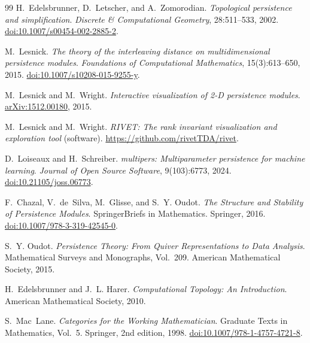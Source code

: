 \documentclass{article}
\newcommand{\<}{\langle}
\renewcommand{\>}{\rangle}
\theoremstyle{definition}
\theoremstyle{remark}
\begin{document}
\begin{thebibliography}{99}
		H.~Edelsbrunner, D.~Letscher, and A.~Zomorodian.
		\newblock \emph{Topological persistence and simplification}.
		\newblock \emph{Discrete \& Computational Geometry}, 28:511--533, 2002.
		\newblock \href{https://doi.org/10.1007/s00454-002-2885-2}{doi:10.1007/s00454-002-2885-2}.
		
		M.~Lesnick.
		\newblock \emph{The theory of the interleaving distance on multidimensional
			persistence modules}.
		\newblock \emph{Foundations of Computational Mathematics}, 15(3):613--650, 2015.
		\newblock \href{https://doi.org/10.1007/s10208-015-9255-y}{doi:10.1007/s10208-015-9255-y}.
		
		M.~Lesnick and M.~Wright.
		\newblock \emph{Interactive visualization of 2-D persistence modules}.
		\newblock \href{https://arxiv.org/abs/1512.00180}{arXiv:1512.00180}, 2015.
		
		M.~Lesnick and M.~Wright.
		\newblock \emph{RIVET: The rank invariant visualization and exploration tool}
		(software).
		\newblock \url{https://github.com/rivetTDA/rivet}.
		
		D.~Loiseaux and H.~Schreiber.
		\newblock \emph{multipers: Multiparameter persistence for machine learning}.
		\newblock \emph{Journal of Open Source Software}, 9(103):6773, 2024.
		\newblock \href{https://doi.org/10.21105/joss.06773}{doi:10.21105/joss.06773}.
		
		F.~Chazal, V.~de~Silva, M.~Glisse, and S.~Y. Oudot.
		\newblock \emph{The Structure and Stability of Persistence Modules}.
		\newblock SpringerBriefs in Mathematics. Springer, 2016.
		\newblock \href{https://doi.org/10.1007/978-3-319-42545-0}{doi:10.1007/978-3-319-42545-0}.
		
		S.~Y. Oudot.
		\newblock \emph{Persistence Theory: From Quiver Representations to Data Analysis}.
		\newblock Mathematical Surveys and Monographs, Vol.~209. American Mathematical
		Society, 2015.
		
		H.~Edelsbrunner and J.~L. Harer.
		\newblock \emph{Computational Topology: An Introduction}.
		\newblock American Mathematical Society, 2010.
		
		S.~Mac~Lane.
		\newblock \emph{Categories for the Working Mathematician}.
		\newblock Graduate Texts in Mathematics, Vol.~5. Springer, 2nd edition, 1998.
		\newblock \href{https://doi.org/10.1007/978-1-4757-4721-8}{doi:10.1007/978-1-4757-4721-8}.
		

\end{thebibliography}
\end{document}
